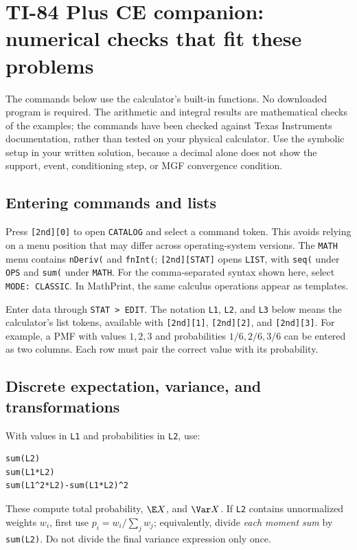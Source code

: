 \section{TI-84 Plus CE companion: numerical checks that fit these problems}
\label{sec:calculator}
The commands below use the calculator's built-in functions. No downloaded program is required. The arithmetic and integral results are mathematical checks of the examples; the commands have been checked against Texas Instruments documentation, rather than tested on your physical calculator. Use the symbolic setup in your written solution, because a decimal alone does not show the support, event, conditioning step, or MGF convergence condition.

\subsection{Entering commands and lists}
Press \texttt{[2nd][0]} to open \texttt{CATALOG} and select a command token. This avoids relying on a menu position that may differ across operating-system versions. The \texttt{MATH} menu contains \texttt{nDeriv(} and \texttt{fnInt(}; \texttt{[2nd][STAT]} opens \texttt{LIST}, with \texttt{seq(} under \texttt{OPS} and \texttt{sum(} under \texttt{MATH}. For the comma-separated syntax shown here, select \texttt{MODE: CLASSIC}. In MathPrint, the same calculus operations appear as templates.

Enter data through \texttt{STAT > EDIT}. The notation \texttt{L1}, \texttt{L2}, and \texttt{L3} below means the calculator's list tokens, available with \texttt{[2nd][1]}, \texttt{[2nd][2]}, and \texttt{[2nd][3]}. For example, a PMF with values $1,2,3$ and probabilities $1/6,2/6,3/6$ can be entered as two columns. Each row must pair the correct value with its probability.

\subsection{Discrete expectation, variance, and transformations}
With values in \texttt{L1} and probabilities in \texttt{L2}, use:
\begin{verbatim}
sum(L2)
sum(L1*L2)
sum(L1^2*L2)-sum(L1*L2)^2
\end{verbatim}
These compute total probability, $\E X$, and $\Var X$. If \texttt{L2} contains unnormalized weights $w_i$, first use $p_i=w_i/\sum_jw_j$; equivalently, divide \emph{each moment sum} by \texttt{sum(L2)}. Do not divide the final variance expression only once.

